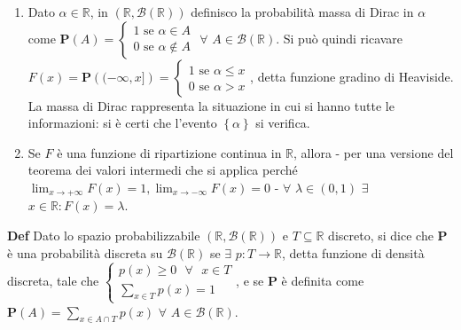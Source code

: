 \documentclass{article}
\begin{document}
\begin{enumerate}
\item Dato $\alpha \in 
\mathbb{R}
$, in $\left( 
\mathbb{R}
,\mathcal{B}\left( 
\mathbb{R}
\right) \right) $ definisco la probabilit\`{a} massa di Dirac in $\alpha $
come $\mathbf{P}\left( A\right) =\left\{ 
\begin{array}{c}
1\text{ se }\alpha \in A \\ 
0\text{ se }\alpha \not\in A%
\end{array}%
\right. $ $\forall $ $A\in \mathcal{B}\left( 
\mathbb{R}
\right) $. Si pu\`{o} quindi ricavare $F\left( x\right) =\mathbf{P}\left(
(-\infty ,x]\right) =\left\{ 
\begin{array}{c}
1\text{ se }\alpha \leq x \\ 
0\text{ se }\alpha >x%
\end{array}%
\right. $, detta funzione gradino di Heaviside. La massa di Dirac
rappresenta la situazione in cui si hanno tutte le informazioni: si \`{e}
certi che l'evento $\left\{ \alpha \right\} $ si verifica.

\item Se $F$ \`{e} una funzione di ripartizione continua in $%
\mathbb{R}
$, allora - per una versione del teorema dei valori intermedi che si applica
perch\'{e} $\lim_{x\rightarrow +\infty }F\left( x\right)
=1,\lim_{x\rightarrow -\infty }F\left( x\right) =0$ - $\forall $ $\lambda
\in \left( 0,1\right) $ $\exists $ $x\in 
\mathbb{R}
:F\left( x\right) =\lambda $.
\end{enumerate}

\textbf{Def} Dato lo spazio probabilizzabile $\left( 
\mathbb{R}
,\mathcal{B}\left( 
\mathbb{R}
\right) \right) $ e $T\subseteq 
\mathbb{R}
$ discreto, si dice che $\mathbf{P}$ \`{e} una probabilit\`{a} discreta su $%
\mathcal{B}\left( 
\mathbb{R}
\right) $ se $\exists $ $p:T\rightarrow 
\mathbb{R}
$, detta funzione di densit\`{a} discreta, tale che $\left\{ 
\begin{array}{c}
p\left( x\right) \geq 0\text{ }\forall \text{ }x\in T \\ 
\sum_{x\in T}p\left( x\right) =1%
\end{array}%
\right. $, e se $\mathbf{P}$ \`{e} definita come $\mathbf{P}\left( A\right)
=\sum_{x\in A\cap T}p\left( x\right) $ $\forall $ $A\in \mathcal{B}\left( 
\mathbb{R}
\right) $.
\end{document}
